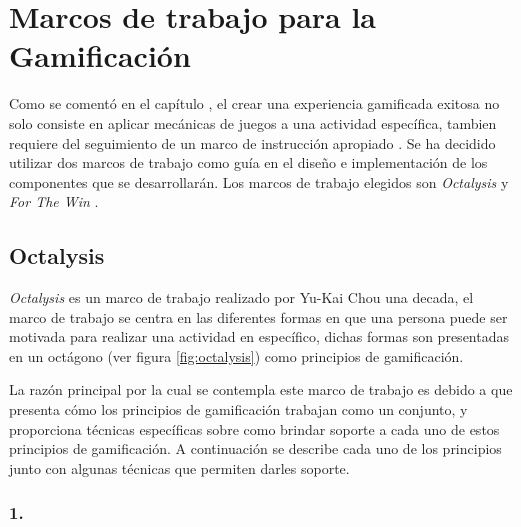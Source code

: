 \section{Marcos de trabajo para la Gamificación}

 Como se comentó en el capítulo , el crear una experiencia
 gamificada exitosa no solo consiste en aplicar mecánicas de juegos a una actividad
 específica, tambien requiere del seguimiento de un marco de instrucción apropiado \cite[p. 1110]{GamInE-Learning}.
 Se ha decidido utilizar dos marcos de trabajo como guía en el diseño e implementación
 de los componentes que se desarrollarán. Los marcos de trabajo elegidos son {\it Octalysis}
 \cite{Octalysis} y {\it For The Win} \cite{FrameWorkForTheWin}.

\subsection{Octalysis}
\label{sec:octalysis}

 {\it Octalysis} es un marco de trabajo realizado por Yu-Kai Chou una decada, el marco de
 trabajo se centra en las diferentes formas en que una persona puede ser motivada para
 realizar una actividad en específico, dichas formas son presentadas en un octágono
 (ver figura \ref{fig:octalysis}) como principios de gamificación.\\
 
    

 \noindent La razón principal por la cual se contempla este marco de trabajo es debido a que presenta
 cómo los principios de gamificación trabajan como un conjunto, y proporciona técnicas específicas
 sobre como brindar soporte a cada uno de estos principios de gamificación. A continuación se
 describe cada uno de los principios junto con algunas técnicas que permiten darles soporte.
    
\subsubsection{1. \principioI} \label{subsec:principioI}
  
